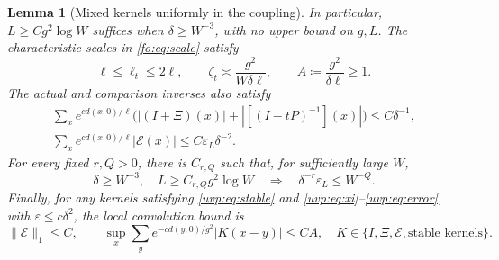 \documentclass[11pt]{article}
\numberwithin{equation}{section}
\newtheorem{lemma}[theorem]{Lemma}
\theoremstyle{remark}
\begin{document}
\begin{lemma}[Mixed kernels uniformly in the coupling]
In particular, $L\ge Cg^2\log W$ suffices when $\delta\ge W^{-3}$,
with no upper bound on $g,L$. 
The characteristic scales in \eqref{fo:eq:scale} satisfy
\begin{equation}\label{da:eq:primitive-scale-conversion}
 \ell\le\ell_t\le2\ell,\qquad
 \zeta_t\asymp\frac{g^2}{W\delta\ell},\qquad
 A\coloneqq\frac{g^2}{\delta\ell}\ge1.
\end{equation}
The actual and comparison inverses also satisfy
\begin{equation}\label{da:eq:weighted-actual-kernels}
 \begin{gathered}
 \sum_x e^{c d(x,0)/\ell}
    \bigl(|(I+\Xi)(x)|+|[(I-tP)^{-1}](x)|\bigr)\le C\delta^{-1},\\
 \sum_x e^{c d(x,0)/\ell}|\mathcal E(x)|\le C\varepsilon_L\delta^{-2}.
 \end{gathered}
\end{equation}
For every fixed $r,Q>0$, there is $C_{r,Q}$ such that, for sufficiently
large $W$,
\begin{equation}\label{da:eq:kernel-accuracy}
 \delta\ge W^{-3},\quad L\ge C_{r,Q}g^2\log W
 \quad\Longrightarrow\quad \delta^{-r}\varepsilon_L\le W^{-Q}.
\end{equation}
Finally, for any kernels satisfying
\eqref{uvp:eq:stable} and \eqref{uvp:eq:xi}--\eqref{uvp:eq:error}, with
$\varepsilon\le c\delta^2$, the local convolution bound is
\begin{equation}\label{uvp:eq:localconv}
 \|\mathcal E\|_1\le C,\qquad
 \sup_x\sum_y e^{-c d(y,0)/g^2}|K(x-y)|\le CA,
 \quad K\in\{I,\Xi,\mathcal E,\text{stable kernels}\}.
\end{equation}
\end{lemma}
\end{document}
